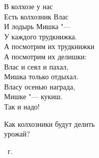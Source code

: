 \begin{center}
В колхозе у нас\\
Есть колхозник Влас\\
И лодырь Мишка "---\\
У каждого трудкнижка.\\
А посмотрим их трудкнижки\\
А посмотрим их делишки:\\
Влас и сеял и пахал,\\
Мишка только отдыхал.\\
Власу осенью награда,\\
Мишке "--- кукиш.\\
Так и надо!

Как колхозники будут делить\\
урожай?
\end{center}

\raggedright
{}~г.\\
